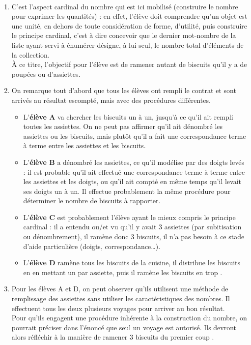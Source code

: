 \begin{corrige}
\ \\ [-5mm]
\begin{enumerate}
   \item C'est l'aspect cardinal du nombre qui est ici mobilisé (construire le nombre pour exprimer les quantités) : en effet, l'élève doit comprendre qu'un objet est une unité, en dehors de toute considération de forme, d'utilité, puis construire le principe cardinal, c'est à dire concevoir que le dernier mot-nombre de la liste ayant servi à énumérer désigne, à lui seul, le nombre total d'éléments de la collection. \\
   À ce titre, l'objectif pour l'élève est de ramener autant de biscuits qu'il y a de poupées ou d'assiettes.
   \bigskip
   \item On remarque tout d'abord que tous les élèves ont rempli le contrat et sont arrivés au résultat escompté, mais avec des procédures différentes.
   \begin{itemize}
      \item L'\textbf{élève A} va chercher les biscuits un à un, jusqu'à ce qu'il ait rempli toutes les assiettes. On ne peut pas affirmer qu'il ait dénombré les assiettes ou les biscuits, mais plutôt qu'il a fait une \og correspondance terme à terme \fg{} entre les assiettes et les biscuits.
      \item L'\textbf{élève B} a dénombré les assiettes, ce qu'il modélise par des doigts levés : il est probable qu'il ait effectué une correspondance terme à terme entre les assiettes et les doigts, ou qu'il ait compté en même temps qu'il levait ses doigts un à un. Il effectue probablement la même procédure pour déterminer le nombre de biscuits à rapporter.
      \item L'\textbf{élève C} est probablement l'élève ayant le mieux compris le principe cardinal : il a entendu ou/et vu qu'il y avait 3 assiettes (par subitisation ou dénombrement), il ramène donc 3 biscuits, il n'a pas besoin à ce stade d'aide particulière (doigts, correspondance\dots{}). 
      \item L'\textbf{élève D} ramène tous les biscuits de la cuisine, il distribue les biscuits en en mettant un par assiette, puis il ramène les biscuits \og en trop \fg{}. \\ 
   \end{itemize}
   \bigskip
   \item Pour les élèves A et D, on peut observer qu'ils utilisent une méthode de \og remplissage \fg{} des assiettes sans utiliser les caractéristiques des nombres. Il effectuent tous les deux plusieurs voyages pour arriver au bon résultat. \\
   Pour qu'ils engagent une procédure inhérente à la construction du nombre, on pourrait préciser dans l'énoncé que seul un voyage est autorisé. Ils devront alors réfléchir à la manière de ramener 3 biscuits \og du premier coup \fg.
\end{enumerate}
\end{corrige}

